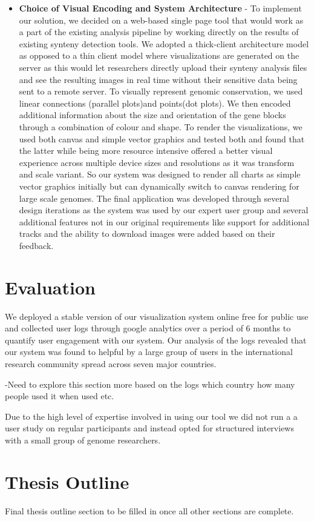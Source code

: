 \begin{itemize}
    \item \textbf{Choice of Visual Encoding and System Architecture} - 
    To implement our solution, we decided on a web-based single page tool that would work as a part of the existing analysis pipeline by working directly on the results of existing synteny detection tools. We adopted a thick-client architecture model as opposed to a thin client model where visualizations are generated on the server as this would let researchers directly upload their synteny analysis files and see the resulting images in real time without their sensitive data being sent to a remote server. To visually represent genomic conservation, we used linear connections (parallel plots)and points(dot plots). We then encoded additional information about the size and orientation of the gene blocks through a combination of colour and shape.
    To render the visualizations, we used both canvas and simple vector graphics and tested both and found that the latter while being more resource intensive offered a better visual experience across multiple device sizes and resolutions as it was transform and scale variant. So our system was designed to render all charts as simple vector graphics initially but can dynamically switch to canvas rendering for large scale genomes. The final application was developed through several design iterations as the system was used by our expert user group and several additional features not in our original requirements like support for additional tracks and the ability to download images were added based on their feedback. 

\end{itemize}

\section{Evaluation}

We deployed a stable version of our visualization system online free for public use and collected user logs through google analytics over a period of 6 months to quantify user engagement with our system. Our analysis of the logs revealed that our system was found to helpful by a large group of users in the international research community spread across seven major countries.

-Need to explore this section more based on the logs which country how many people used it when used etc.

Due to the high level of expertise involved in using our tool we did not run a a user study on regular participants and instead opted for structured interviews with a small group of genome researchers.

\section{Thesis Outline}

Final thesis outline section to be filled in once all other sections are complete.